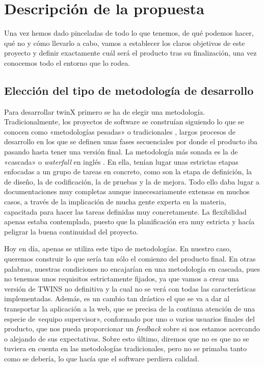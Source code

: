 \section{Descripción de la propuesta}
\label{sec:propuesta}

Una vez hemos dado pinceladas de todo lo que tenemos, de qué podemos hacer, qué no y cómo llevarlo a cabo, vamos a establecer los claros objetivos de este proyecto y definir exactamente cuál será el producto tras su finalización, una vez conocemos todo el entorno que lo rodea. 

\subsection{Elección del tipo de metodología de desarrollo}
\label{eleccionMetodologia}
Para desarrollar twinX primero se ha de elegir una metodología. Tradicionalmente, los proyectos de software se construían siguiendo lo que se conocen como «metodologías pesadas» o tradicionales \cite{waterfall1}, largos procesos de desarrollo en los que se definen unas fases secuenciales por donde el producto iba pasando hasta tener una versión final. La metodología más sonada es la de «cascada» o \textit{waterfall} en inglés \cite{waterfall2}. En ella, tenían lugar unas estrictas etapas enfocadas a un grupo de tareas en concreto, como son la etapa de definición, la de diseño, la de codificación, la de pruebas y la de mejora. Todo ello daba lugar a documentaciones muy completas aunque innecesariamente extensas en muchos casos, a través de la implicación de mucha gente experta en la materia, capacitada para hacer las tareas definidas muy concretamente. La flexibilidad apenas estaba contemplada, puesto que la planificación era muy estricta y hacía peligrar la buena continuidad del proyecto.

Hoy en día, apenas se utiliza este tipo de metodologías. En nuestro caso, queremos construir lo que sería tan sólo el comienzo del producto final. En otras palabras, nuestras condiciones no encajarían en una metodología en cascada, pues no tenemos unos requisitos estrictamente fijados, ya que vamos a crear una versión de TWINS no definitiva y la cual no se verá con todas las características implementadas. Además, es un cambio tan drástico el que se va a dar al transportar la aplicación a la web, que se precisa de la continua atención de una especie de «equipo supervisor», conformado por uno o varios usuarios finales del producto, que nos pueda proporcionar un \textit{feedback} sobre si nos estamos acercando o alejando de sus expectativas. Sobre esto último, diremos que no es que no se tuviera en cuenta en las metodologías tradicionales, pero no se primaba tanto como se debería, lo que hacía que el software perdiera calidad.

